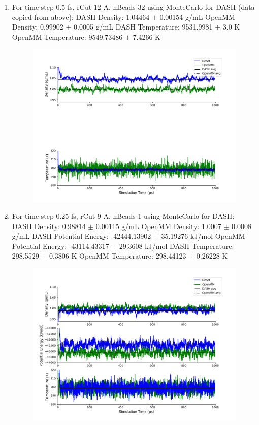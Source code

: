 \documentclass[12pt,reqno]{amsart}
\numberwithin{equation}{section}
\begin{document}
\begin{enumerate}
\item For time step 0.5 fs, rCut 12 A, nBeads 32 using MonteCarlo for DASH (data copied from above):
\subitem DASH Density: 1.04464 $\pm$ 0.00154 g/mL
\subitem OpenMM Density: 0.99902 $\pm$ 0.0005 g/mL
\subitem DASH Temperature: 9531.9981 $\pm$ 3.0  K
\subitem OpenMM Temperature:  9549.73486 $\pm$ 7.4266 K
\begin{figure}[H]
\centering
\includegraphics[scale=0.7]{MC-MM-nBead32-rCut12-ts05-update}
\end{figure}

\item For time step 0.25 fs, rCut 9 A, nBeads 1 using MonteCarlo for DASH:
\subitem DASH Density: 0.98814 $\pm$ 0.00115 g/mL
\subitem OpenMM Density: 1.0007 $\pm$ 0.0008 g/mL
\subitem DASH Potential Energy: -42444.13902 $\pm$ 35.19276 kJ/mol
\subitem OpenMM Potential Energy: -43114.43317 $\pm$ 29.3608 kJ/mol
\subitem DASH Temperature: 298.5529 $\pm$ 0.3806  K
\subitem OpenMM Temperature:  298.44123 $\pm$ 0.26228 K
\begin{figure}[H]
\centering
\includegraphics[scale=0.7]{MC-MM-nBead1-rCut9-ts025}
\end{figure}


\end{enumerate}
\end{document}

